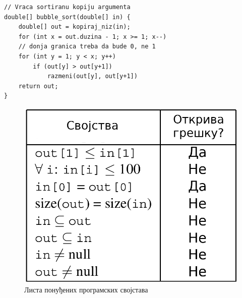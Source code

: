 \documentclass[a4paper]{article}
\begin{document}
{\begin{verbatim}
// Vraca sortiranu kopiju argumenta
double[] bubble_sort(double[] in) {
    double[] out = kopiraj_niz(in);
    for (int x = out.duzina - 1; x >= 1; x--)
    // donja granica treba da bude 0, ne 1
    for (int y = 1; y < x; y++)
        if (out[y] > out[y+1])
            razmeni(out[y], out[y+1])
    return out;
}
\end{verbatim}



\begin{figure}[h!]
\begin{center}
\includegraphics[scale=0.16]{./slike/latent_examples.png}
\end{center}
    \caption{Листа понуђених програмских својстава}
\label{fig:latent_example}
\end{figure}

}
\end{document}
